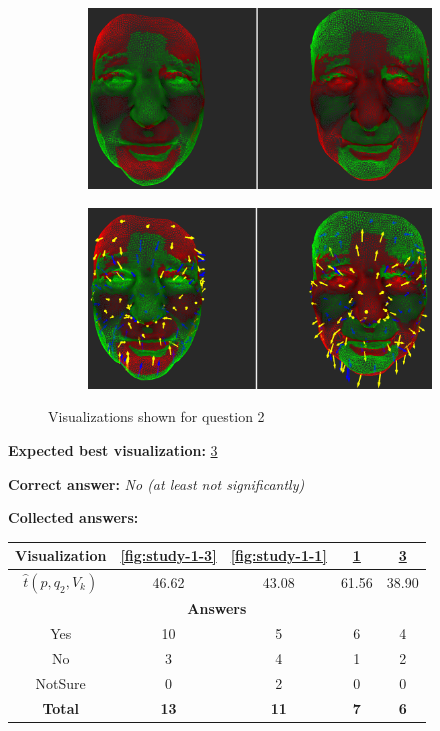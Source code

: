\begin{figure}[h]
\begin{subfigure}{0.49\textwidth}
\includegraphics[width=\textwidth]{./img-study/pair2.PNG}
\caption{}
\label{fig:study-1-2}
\end{subfigure}
\begin{subfigure}{0.49\textwidth}
\includegraphics[width=\textwidth]{./img-study/pair4.PNG}
\caption{}
\label{fig:study-1-4}
\end{subfigure}
\caption{Visualizations shown for question 2}
\end{figure}
\medskip

{\bf Expected best visualization:} \ref{fig:study-1-4}
\medskip

{\bf Correct answer:} {\it No (at least not significantly)}
\medskip

{\bf Collected answers:}

\begin{center}
\begin{tabular}{| c | c | c | c | c |}
	\hline
	Visualization & \ref{fig:study-1-3} & \ref{fig:study-1-1} & \ref{fig:study-1-2} & \ref{fig:study-1-4}\\ \hline
	\(\widehat{t}(p, q_2, V_k)\) & 46.62 & 43.08 & 61.56 & 38.90\\ \hline
	\multicolumn{5}{|c|}{\bf Answers} \\ \hline
	Yes & 10 & 5 & 6 & 4\\ \hline
	\rowcolor{yellow!30} No & 3 & 4 & 1 & 2\\ \hline
	NotSure & 0 & 2 & 0 & 0\\ \hline
	{\bf Total} & {\bf 13} & {\bf 11} & {\bf 7} & {\bf 6}\\ \hline
\end{tabular}
\end{center}
\clearpage


